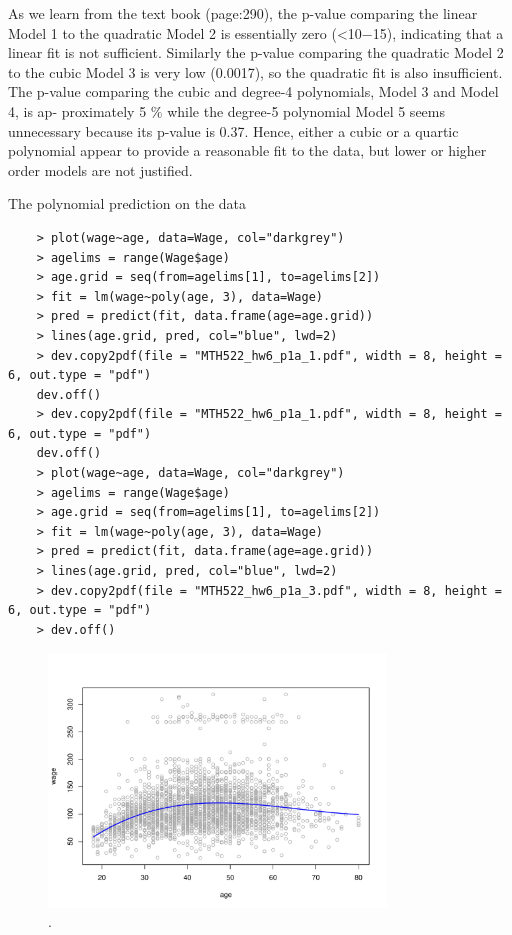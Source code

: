 \documentclass{article}
\begin{document}
As we learn from the text book (page:290), the p-value comparing the linear Model 1 to the quadratic Model 2 is essentially zero (<10−15), indicating that a linear fit is not sufficient. Similarly the p-value comparing the quadratic Model 2 to the cubic Model 3 is very low (0.0017), so the quadratic fit is also insufficient. The p-value comparing the cubic and degree-4 polynomials, Model 3 and Model 4, is ap- proximately 5 $\%$ while the degree-5 polynomial Model 5 seems unnecessary because its p-value is 0.37. Hence, either a cubic or a quartic polynomial appear to provide a reasonable fit to the data, but lower or higher order models are not justified. \\


\newpage

The polynomial prediction on the data
\begin{program}
	\begin{verbatim}
	> plot(wage~age, data=Wage, col="darkgrey")
	> agelims = range(Wage$age)
	> age.grid = seq(from=agelims[1], to=agelims[2])
	> fit = lm(wage~poly(age, 3), data=Wage)
	> pred = predict(fit, data.frame(age=age.grid))
	> lines(age.grid, pred, col="blue", lwd=2)
	> dev.copy2pdf(file = "MTH522_hw6_p1a_1.pdf", width = 8, height = 6, out.type = "pdf")  
	dev.off()
	> dev.copy2pdf(file = "MTH522_hw6_p1a_1.pdf", width = 8, height = 6, out.type = "pdf")  
	dev.off()
	> plot(wage~age, data=Wage, col="darkgrey")
	> agelims = range(Wage$age)
	> age.grid = seq(from=agelims[1], to=agelims[2])
	> fit = lm(wage~poly(age, 3), data=Wage)
	> pred = predict(fit, data.frame(age=age.grid))
	> lines(age.grid, pred, col="blue", lwd=2)
	> dev.copy2pdf(file = "MTH522_hw6_p1a_3.pdf", width = 8, height = 6, out.type = "pdf")  
	> dev.off()	
	\end{verbatim}
\end{program}



\begin{figure}[htb]
	\begin{center}
		\includegraphics[width=0.8\textwidth]{MTH522_hw6_p1a_3.pdf}
	\end{center}
	\caption{.}
	\label{fig:MTH522_hw6_p1a_3}
\end{figure}
\end{document}
